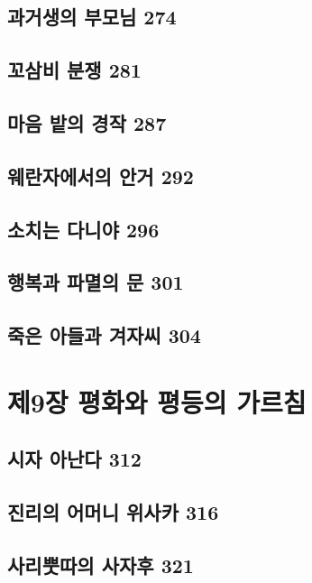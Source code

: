 \documentclass[12pt, a4paper, oneside]{book}
\let\stdsection\section
\renewcommand\section{\newpage\stdsection}
\begin{document}
	\section{과거생의 부모님 274 }

	\section{꼬삼비 분쟁 281 }

	\section{마음 밭의 경작 287 }

	\section{웨란자에서의 안거 292 }

	\section{소치는 다니야 296 }

	\section{행복과 파멸의 문 301 }

	\section{죽은 아들과 겨자씨 304}




	\chapter{제9장 평화와 평등의 가르침}
	\noptcrule
	\parttoc				


	\section{시자 아난다 312 }

	\section{진리의 어머니 위사카 316 }

	\section{사리뿟따의 사자후 321 }
\end{document}
